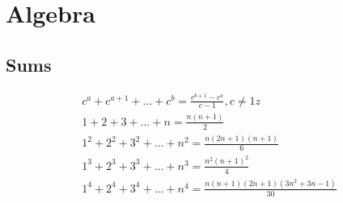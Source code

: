 \section{Algebra}




\subsection{Sums}
\begin{equation}
  \begin{array}{c}
    c^a + c^{a+1} + \dots + c^{b} = \frac{c^{b+1} - c^a}{c-1}, c \neq 1 z \\
    1 + 2 + 3 + \dots + n = \frac{n(n+1)}{2} \\
    1^2 + 2^2 + 3^2 + \dots + n^2 = \frac{n(2n+1)(n+1)}{6} \\
    1^3 + 2^3 + 3^3 + \dots + n^3 = \frac{n^2(n+1)^2}{4} \\
    1^4 + 2^4 + 3^4 + \dots + n^4 = \frac{n(n+1)(2n+1)(3n^2 + 3n - 1)}{30}
  \end{array}
\end{equation}

